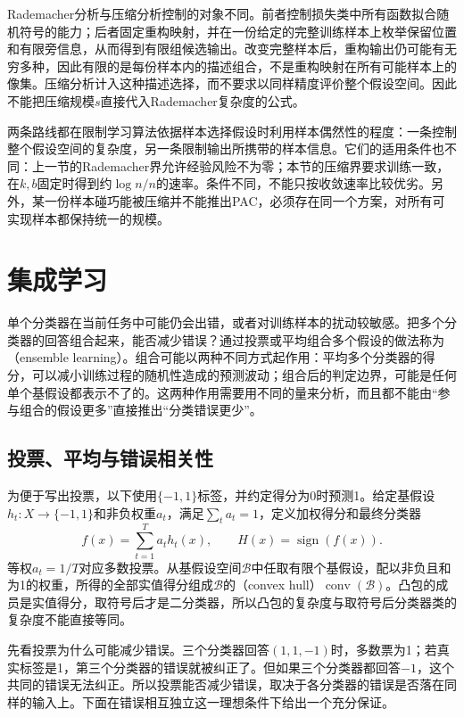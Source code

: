Rademacher分析与压缩分析控制的对象不同。前者控制损失类中所有函数拟合随机符号的能力；后者固定重构映射，并在一份给定的完整训练样本上枚举保留位置和有限旁信息，从而得到有限组候选输出。改变完整样本后，重构输出仍可能有无穷多种，因此有限的是每份样本内的描述组合，不是重构映射在所有可能样本上的像集。压缩分析计入这种描述选择，而不要求以同样精度评价整个假设空间。因此不能把压缩规模$s$直接代入Rademacher复杂度的公式。

两条路线都在限制学习算法依据样本选择假设时利用样本偶然性的程度：一条控制整个假设空间的复杂度，另一条限制输出所携带的样本信息。它们的适用条件也不同：上一节的Rademacher界允许经验风险不为零；本节的压缩界要求训练一致，在$k,b$固定时得到约$\log n/n$的速率。条件不同，不能只按收敛速率比较优劣。另外，某一份样本碰巧能被压缩并不能推出PAC，必须存在同一个方案，对所有可实现样本都保持统一的规模。

\section{集成学习}
\label{sec:boosting}

单个分类器在当前任务中可能仍会出错，或者对训练样本的扰动较敏感。把多个分类器的回答组合起来，能否减少错误？通过投票或平均组合多个假设的做法称为（ensemble learning）。组合可能以两种不同方式起作用：平均多个分类器的得分，可以减小训练过程的随机性造成的预测波动；组合后的判定边界，可能是任何单个基假设都表示不了的。这两种作用需要用不同的量来分析，而且都不能由“参与组合的假设更多”直接推出“分类错误更少”。

\subsection{投票、平均与错误相关性}

为便于写出投票，以下使用$\{-1,1\}$标签，并约定得分为0时预测1。给定基假设$h_t:X\to\{-1,1\}$和非负权重$a_t$，满足$\sum_ta_t=1$，定义加权得分和最终分类器
\[
 f(x)=\sum_{t=1}^T a_t h_t(x),\qquad H(x)=\operatorname{sign}(f(x)).
\]
等权$a_t=1/T$对应多数投票。从基假设空间$\mathcal B$中任取有限个基假设，配以非负且和为1的权重，所得的全部实值得分组成$\mathcal B$的（convex hull）$\operatorname{conv}(\mathcal B)$。凸包的成员是实值得分，取符号后才是二分类器，所以凸包的复杂度与取符号后分类器类的复杂度不能直接等同。

先看投票为什么可能减少错误。三个分类器回答$(1,1,-1)$时，多数票为1；若真实标签是1，第三个分类器的错误就被纠正了。但如果三个分类器都回答$-1$，这个共同的错误无法纠正。所以投票能否减少错误，取决于各分类器的错误是否落在同样的输入上。下面在错误相互独立这一理想条件下给出一个充分保证。

